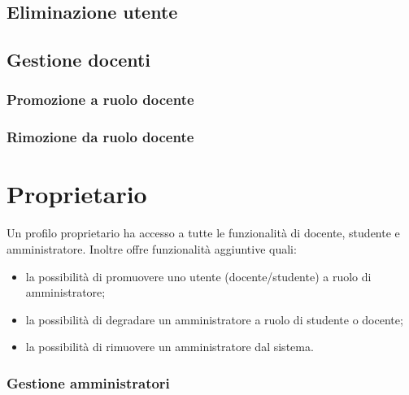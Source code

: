 \documentclass[12pt,a4paper]{article}
\begin{document}
		\subsection{Eliminazione utente}
		\subsection{Gestione docenti}
			\subsubsection{Promozione a ruolo docente}
			\subsubsection{Rimozione da ruolo docente}
	
	\section{Proprietario} 
	Un profilo proprietario ha accesso a tutte le funzionalità di docente, studente e amministratore.
	Inoltre offre funzionalità aggiuntive quali:
	\begin{itemize}
		\item la possibilità di promuovere uno utente (docente/studente) a ruolo di amministratore;
		\item la possibilità di degradare un amministratore a ruolo di studente o docente;
		\item la possibilità di rimuovere un amministratore dal sistema.
	\end{itemize}
	\subsubsection{Gestione  amministratori}


	
\end{document}
